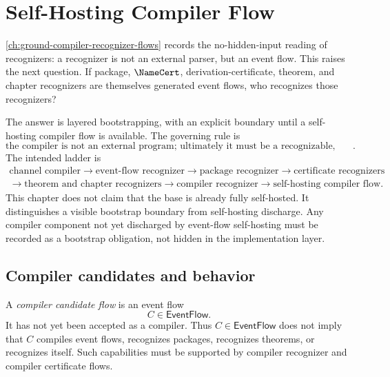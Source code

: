 \chapter{Self-Hosting Compiler Flow}
\label{ch:ground-compiler-self-hosting-compiler-flow}

\autoref{ch:ground-compiler-recognizer-flows} records the no-hidden-input reading of recognizers: a recognizer is not an external parser, but an event flow. This raises the next question. If package, $\NameCert$, derivation-certificate, theorem, and chapter recognizers are themselves generated event flows, who recognizes those recognizers?

The answer is layered bootstrapping, with an explicit boundary until a self-hosting compiler flow is available. The governing rule is
$$
  \boxed{\text{the compiler is not an external program; ultimately it must be a recognizable, compilable, reproducible event flow}.}
$$
The intended ladder is
$$
\begin{gathered}
  \text{channel compiler}
  \longrightarrow
  \text{event-flow recognizer}
  \longrightarrow
  \text{package recognizer}
  \longrightarrow
  \text{certificate recognizers}\\
  \longrightarrow
  \text{theorem and chapter recognizers}
  \longrightarrow
  \text{compiler recognizer}
  \longrightarrow
  \text{self-hosting compiler flow}.
\end{gathered}
$$
This chapter does not claim that the base is already fully self-hosted. It distinguishes a visible bootstrap boundary from self-hosting discharge. Any compiler component not yet discharged by event-flow self-hosting must be recorded as a bootstrap obligation, not hidden in the implementation layer.

\section{Compiler candidates and behavior}
\label{sec:self-hosting-compiler-candidates-behavior}

\begin{definition}
\label{def:self-hosting-compiler-candidate-flow}
A \emph{compiler candidate flow} is an event flow
$$
  C\in\mathsf{EventFlow}.
$$
It has not yet been accepted as a compiler. Thus $C\in\mathsf{EventFlow}$ does not imply that $C$ compiles event flows, recognizes packages, recognizes theorems, or recognizes itself. Such capabilities must be supported by compiler recognizer and compiler certificate flows.
\end{definition}

